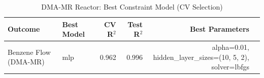 \begin{table}[ht]
\centering
\caption{DMA-MR Reactor: Best Constraint Model (CV Selection)}
\begin{tabular}{llrrrl}
\toprule
Outcome & Best Model & CV R$^2$ & Test R$^2$ & Best Parameters \\
\midrule
Benzene Flow (DMA-MR) & mlp & 0.962 & 0.996 & alpha=0.01, hidden_layer_sizes=(10, 5, 2), solver=lbfgs \\
\bottomrule
\end{tabular}
\end{table}